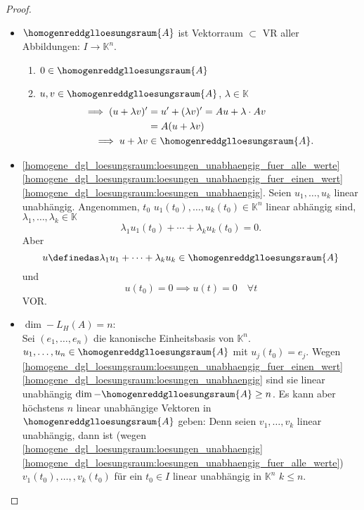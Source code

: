 \begin{proof}
  \begin{itemize}
    \item \( \homogenreddglloesungsraum{A} \) ist Vektorraum \( \subset \) VR aller Abbildungen: \( I\to \mathbb{K}^n \).
    \begin{enumerate}
      \item \( 0\in \homogenreddglloesungsraum{A} \) \checkmark
      \item \( u,v\in \homogenreddglloesungsraum{A} \), \( \lambda\in \mathbb{K} \)
      \begin{align*}
        \implies (u+\lambda v)'&=u'+(\lambda v)'=A u+\lambda\cdot A v\\
        &=A(u+\lambda v)\\
        \implies u+\lambda v&\in \homogenreddglloesungsraum{A}.
      \end{align*}
    \end{enumerate}
    \item \ref{homogene_dgl_loesungsraum:loesungen_unabhaengig_fuer_alle_werte} \timplies \ref{homogene_dgl_loesungsraum:loesungen_unabhaengig_fuer_einen_wert} \timplies \ref{homogene_dgl_loesungsraum:loesungen_unabhaengig}.
    \minisec{\ref{homogene_dgl_loesungsraum:loesungen_unabhaengig} \timplies \ref{homogene_dgl_loesungsraum:loesungen_unabhaengig_fuer_alle_werte}} Seien \( u_1,\dotsc, u_k \) linear unabhängig. Angenommen, \texists  \( t_0 \) \sd \( u_1(t_0),\dotsc,u_k(t_0)\in \mathbb{K}^n\) linear abhängig sind, \dh \texists  \( \lambda_1,\dotsc,\lambda_k\in \mathbb{K} \) \sd 
    \begin{equation*}
      \lambda_1 u_1(t_0)+\dotsb+\lambda_k u_k (t_0)=0.
    \end{equation*}
    Aber
    \begin{equation*}
      u\definedas \lambda_1 u_1+\dotsb+\lambda_k u_k \in \homogenreddglloesungsraum{A}
    \end{equation*}
    und
    \begin{equation*}
      u(t_0)=0\implies u(t)=0\quad \forall t
    \end{equation*}
    \contra VOR\@.
    \item \( \dim-{}{L_H(A)}=n \):\\
    Sei \( (e_1,\dotsc,e_n) \) die kanonische Einheitsbasis von \( \mathbb{K}^n \). \texists \( u_1,\dotsc,u_n\in \homogenreddglloesungsraum{A} \) mit \( u_j(t_0)=e_j \). Wegen \ref{homogene_dgl_loesungsraum:loesungen_unabhaengig_fuer_einen_wert} \timplies \ref{homogene_dgl_loesungsraum:loesungen_unabhaengig} sind sie linear unabhängig \timplies \( \dim-{}{\homogenreddglloesungsraum{A}}\geq n \). Es kann aber höchstens \( n \) linear unabhängige Vektoren in \( \homogenreddglloesungsraum{A} \) geben: Denn seien \( v_1,\dotsc,v_k \) linear unabhängig, dann ist (wegen \ref{homogene_dgl_loesungsraum:loesungen_unabhaengig} \timplies \ref{homogene_dgl_loesungsraum:loesungen_unabhaengig_fuer_alle_werte}) \( v_1(t_0),\dotsc,, v_k(t_0) \) für ein \( t_0\in I \) linear unabhängig in \( \mathbb{K}^n \) \timplies \( k\leq n \).
  \end{itemize}
\end{proof}
